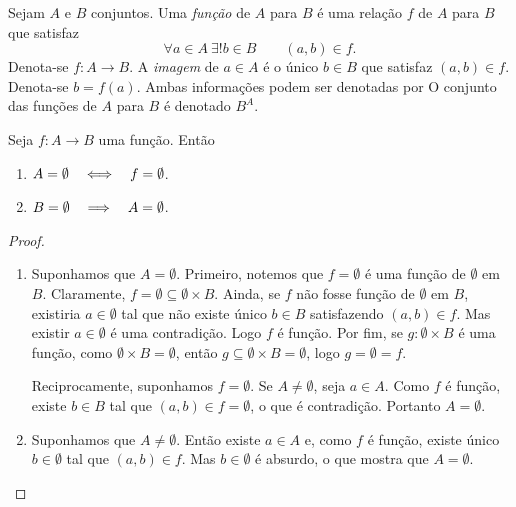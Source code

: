 \begin{defi}
Sejam $A$ e $B$ conjuntos. Uma \emph{função} de $A$ para $B$ é uma relação $f$ de $A$ para $B$ que satisfaz
	\begin{equation*}
	\forall a \in A \ \exists! b \in B \qquad (a,b) \in f.
	\end{equation*}
Denota-se $f: A \to B$. A \emph{imagem} de $a \in A$ é o único $b \in B$ que satisfaz $(a,b) \in f$. Denota-se $b=f(a)$. Ambas informações podem ser denotadas por  O conjunto das funções de $A$ para $B$ é denotado $B^A$.
\end{defi}

\begin{prop}
Seja $f: A \to B$ uma função. Então
	\begin{enumerate}
	\item $A=\emptyset \quad \Longleftrightarrow \quad f=\emptyset$.
	\item $B=\emptyset \quad \Longrightarrow \quad A=\emptyset$.
	\end{enumerate}
\end{prop}
\begin{proof}
	\begin{enumerate}
	\item Suponhamos que $A=\emptyset$. Primeiro, notemos que $f=\emptyset$ é uma função de $\emptyset$ em $B$. Claramente, $f = \emptyset \subseteq \emptyset \times B$. Ainda, se $f$ não fosse função de $\emptyset$ em $B$, existiria $a \in \emptyset$ tal que não existe único $b \in B$ satisfazendo $(a,b) \in f$. Mas existir $a \in \emptyset$ é uma contradição. Logo $f$ é função. Por fim, se $g: \emptyset \times B$ é uma função, como $\emptyset \times B = \emptyset$, então $g \subseteq \emptyset \times B = \emptyset$, logo $g=\emptyset=f$.
	
Reciprocamente, suponhamos $f=\emptyset$. Se $A \neq \emptyset$, seja $a \in A$. Como $f$ é função, existe $b \in B$ tal que $(a,b) \in f=\emptyset$, o que é contradição. Portanto $A=\emptyset$.
	
	\item Suponhamos que $A \neq \emptyset$. Então existe $a \in A$ e, como $f$ é função, existe único $b \in \emptyset$ tal que $(a,b) \in f$. Mas $b \in \emptyset$ é absurdo, o que mostra que $A = \emptyset$.
	\end{enumerate}
\end{proof}

